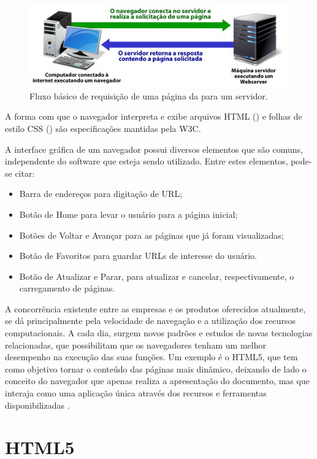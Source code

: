 \documentclass[espaco=simples,appendix=Name]{abnt}
\begin{document}
\begin{figure}[h]
  \centering
    \includegraphics[scale=0.4]{web_basic.png}
  \caption{Fluxo básico de requisição de uma página da  para um servidor.}
\end{figure}
 
A forma com que o navegador interpreta e exibe arquivos HTML () e folhas de estilo CSS () são especificações mantidas pela W3C.

A interface gráfica de um navegador possui diversos elementos que são comuns, independente do software que esteja sendo utilizado. Entre estes elementos, pode-se citar: 
\begin{itemize}
	\item Barra de endereços para digitação de URL;
	\item Botão de Home para levar o usuário para a página inicial;
	\item Botões de Voltar e Avançar para as páginas que já foram visualizadas;
	\item Botão de Favoritos para guardar URLs de interesse do usuário.
	\item Botão de Atualizar e Parar, para atualizar e cancelar, respectivamente, o carregamento de páginas.
\end{itemize}

A concorrência existente entre as empresas e os produtos oferecidos atualmente, se dá principalmente pela velocidade de navegação e a utilização dos recursos computacionais. A cada dia, surgem novos padrões e estudos de novas tecnologias relacionadas, que possibilitam que os navegadores tenham um melhor desempenho na execução das suas funções. Um exemplo é o HTML5, que tem como objetivo tornar o conteúdo das páginas mais dinâmico, deixando de lado o conceito do navegador que apenas realiza a apresentação do documento, mas que interaja como uma aplicação única através dos recursos e ferramentas disponibilizadas \cite{WebAppPlataform}.

\section{HTML5}
\end{document}
